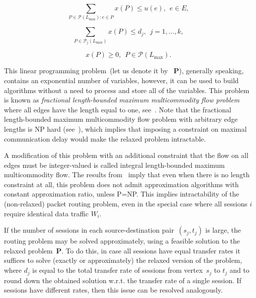 \documentclass{ifacconf}
\begin{document}
\begin{equation}\label{eqn:capas}
\sum_{P\in {\mathcal P}(L_{\max}) : e \in P}  x(P) \le u(e), \ \ e\in
E,
\end{equation}

\begin{equation}\label{eqn:dem}
\sum_{P\in {\mathcal P}_j(L_{\max})}  x(P) \le d_j, \ \ j=1,\dots,k,
\end{equation}

\begin{equation}\label{eqn:pos}
x(P) \ge 0, \ \ P\in {\mathcal P}(L_{\max}).
\end{equation}

This linear programming problem~(let us denote it by~{\bf
P}), generally speaking, contains an exponential number of variables,
however, it can be used to build algorithms without
a need to process and store all of the variables. This problem is known as 
{\em fractional length-bounded maximum multicommodity flow problem}
where all edges have the length equal to one, see~\cite{Baier03,BEHTV19}.
Note that the fractional length-bounded maximum multicommodity flow problem with arbitrary edge lengths is NP hard (see~\cite{Baier03}), 
which implies that imposing a constraint on maximal communication delay would make the relaxed problem
intractable.

A modification of this problem with
an additional constraint that the flow on all edges must be
integer-valued is called integral length-bounded maximum multicommodity flow. The
results from~\cite{GVY97} imply that even when there is no length
constraint at all, this problem does not admit approximation
algorithms with constant approximation ratio, unless P=NP. This implies intractability of the (non-relaxed) packet routing problem, even in
the special case where all sessions $i$ require identical data traffic $W_i$.

If the number of sessions in each source-destination pair~$(s_j,t_j)$ is large,
the routing problem may be solved approximately, using a feasible solution to the relaxed problem~{\bf P}. To do this,  in case all
sessions have equal transfer rates it suffices to solve (exactly or approximately) the relaxed version of the problem, where $d_j$ is equal to the 
total transfer rate of sessions from vertex~$s_j$ to $t_j$ and to round down the obtained solution w.r.t. the transfer rate of a single session. If sessions have different rates, then this issue can be resolved analogously.
\end{document}
